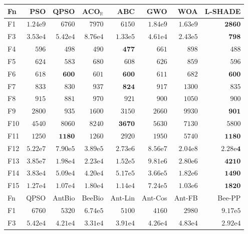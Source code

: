 \begin{tabular}{lrrrrrrr}
\toprule
Fn & PSO & QPSO & ACO$_\mathbb{R}$ & ABC & GWO & WOA & L-SHADE \\
\midrule
F1 & $1.24\mathrm{e}{9}$ & $6760$ & $7970$ & $6150$ & $1.84\mathrm{e}{9}$ & $1.63\mathrm{e}{9}$ & $\mathbf{2860}$ \\
F3 & $3.53\mathrm{e}{4}$ & $5.42\mathrm{e}{4}$ & $8.76\mathrm{e}{4}$ & $1.33\mathrm{e}{5}$ & $4.61\mathrm{e}{4}$ & $2.43\mathrm{e}{5}$ & $\mathbf{798}$ \\
F4 & $596$ & $498$ & $490$ & $\mathbf{477}$ & $661$ & $898$ & $488$ \\
F5 & $624$ & $583$ & $680$ & $608$ & $626$ & $859$ & $596$ \\
F6 & $618$ & $\mathbf{600}$ & $601$ & $\mathbf{600}$ & $611$ & $682$ & $\mathbf{600}$ \\
F7 & $833$ & $830$ & $937$ & $\mathbf{824}$ & $917$ & $1300$ & $835$ \\
F8 & $915$ & $881$ & $970$ & $921$ & $900$ & $1050$ & $900$ \\
F9 & $2800$ & $935$ & $1600$ & $3150$ & $2660$ & $9930$ & $\mathbf{901}$ \\
F10 & $4540$ & $8060$ & $8240$ & $\mathbf{3670}$ & $5630$ & $7130$ & $5800$ \\
F11 & $1250$ & $\mathbf{1180}$ & $1260$ & $2920$ & $1950$ & $5740$ & $\mathbf{1180}$ \\
F12 & $5.22\mathrm{e}{7}$ & $7.90\mathrm{e}{5}$ & $3.89\mathrm{e}{5}$ & $2.73\mathrm{e}{6}$ & $8.56\mathrm{e}{7}$ & $2.04\mathrm{e}{8}$ & $\mathbf{2.28\mathrm{e}{4}}$ \\
F13 & $3.85\mathrm{e}{7}$ & $1.98\mathrm{e}{4}$ & $2.23\mathrm{e}{4}$ & $1.52\mathrm{e}{5}$ & $9.81\mathrm{e}{6}$ & $2.80\mathrm{e}{6}$ & $\mathbf{4210}$ \\
F14 & $3.83\mathrm{e}{4}$ & $5.09\mathrm{e}{4}$ & $4.20\mathrm{e}{4}$ & $5.17\mathrm{e}{5}$ & $3.66\mathrm{e}{5}$ & $1.82\mathrm{e}{6}$ & $\mathbf{1490}$ \\
F15 & $1.27\mathrm{e}{4}$ & $1.07\mathrm{e}{4}$ & $1.80\mathrm{e}{4}$ & $1.14\mathrm{e}{4}$ & $7.24\mathrm{e}{5}$ & $1.03\mathrm{e}{6}$ & $\mathbf{1820}$ \\
\midrule
Fn & QPSO & AntBio & BeeBio & Ant-Lin & Ant-Cos & Ant-FB & Bee-PP \\
\midrule
F1 & $6760$ & $5320$ & $6.74\mathrm{e}{5}$ & $5100$ & $4160$ & $2980$ & $9.17\mathrm{e}{5}$ \\
F3 & $5.42\mathrm{e}{4}$ & $4.21\mathrm{e}{4}$ & $3.31\mathrm{e}{4}$ & $3.91\mathrm{e}{4}$ & $4.26\mathrm{e}{4}$ & $4.83\mathrm{e}{4}$ & $2.92\mathrm{e}{4}$ \\

\end{tabular}
